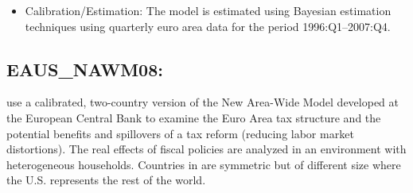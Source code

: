 \documentclass[11pt,a4paper]{article}
\begin{document}
\begin{itemize}
		\item Calibration/Estimation: The model is estimated using Bayesian estimation techniques using quarterly euro area data for the period 1996:Q1--2007:Q4.
		
		
	\end{itemize}
	
	\subsection{EAUS\_NAWM08: \cite{CoenenMcAdamStraub2008}}
	\label{EAUSNAWM08}
	\cite{CoenenMcAdamStraub2008} use a calibrated, two-country version of the New Area-Wide Model developed at the European Central Bank to examine the Euro Area tax structure and the potential benefits and spillovers of a tax reform (reducing labor market distortions). The real effects of fiscal policies are analyzed in an environment with heterogeneous households. Countries in \cite{CoenenMcAdamStraub2008} are symmetric but of different size where the U.S. represents the rest of the world.
	
\end{document}
